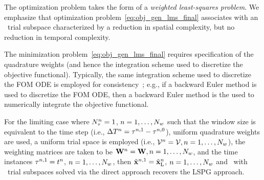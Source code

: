 The optimization problem takes the form of a \textit{weighted least-squares
	problem}. 
We emphasize that optimization problem~\eqref{eq:obj_gen_lms_final} associates
	with an \spatialAcronym\ trial subspace characterized by a reduction in
	spatial complexity, but no reduction in temporal complexity.
 
The minimization problem~\eqref{eq:obj_gen_lms_final} requires specification of the quadrature weights (and hence the integration scheme used to discretize 
the objective functional). Typically, the same integration scheme used to discretize the FOM ODE is employed for consistency~\cite{colloc_review}; e.g., if a  
backward Euler method is used to discretize the FOM ODE, then a backward Euler method is the used to numerically integrate the objective functional.

\begin{remark}
For the limiting case where $N_{\tau}^{n} = 1$, $n=1,\ldots,N_w$ such that the window size is equivalent to the time step (i.e., $\Delta T^{n} = \tau^{n,1} - \tau^{n,0}$), uniform 
quadrature weights are used, a uniform trial space is employed (i.e., $\mathcal{V }^{n} = \mathcal{V }, n=1,\ldots,N_w$), the weighting matrices are taken to be
$\mathbf{W}^{n} = \mathbf{W}, n=1,\ldots,N_w$, and the time instances $\tau^{n,1} = t^n$, $n=1,\ldots,N_w$, then 
$\tilde{\mathbf{x}}^{n,1}  = \tilde{\mathbf{x}}_{\text{L}}^n$, $n=1,\ldots,N_w$ and  
\methodAcronym\ with \spatialAcronym\ trial
	subspaces solved via the direct approach recovers the LSPG approach.   
\end{remark} 
